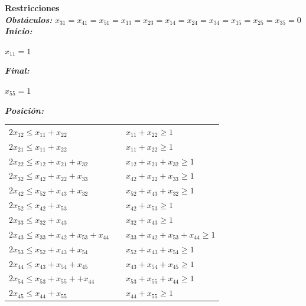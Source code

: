 \documentclass[journal, 10pt]{IEEEtran}
\begin{document}
\textbf{Restricciones}\\

\textbf{\textit{Obstáculos:} }
${x}_{31}={x}_{41}={x}_{51}={x}_{13}={x}_{23}={x}_{14}={x}_{24}={x}_{34}={x}_{15}={x}_{25}= {x}_{35}=0$\\

\textbf{\textit{Inicio: }}
\begin{center}
   ${x}_{11}=1$\\ 
\end{center}

\textbf{\textit{Final: }}
\begin{center}
    ${x}_{55}=1$\\
\end{center}


\textbf{\textit{Posición:} }\\
\begin{table}[H]
\centering
\begin{tabular}{lll}
${2x}_{12}\leq {x}_{11}+{x}_{22}$                   &  & ${x}_{11}+{x}_{22}\geq 1$                   \\
${2x}_{21}\leq {x}_{11}+{x}_{22}$                   &  & ${x}_{11}+{x}_{22}\geq 1$                   \\
${2x}_{22}\leq {x}_{12}+{x}_{21}+{x}_{32}$          &  & ${x}_{12}+{x}_{21}+{x}_{32}\geq 1$          \\
${2x}_{32}\leq {x}_{42}+{x}_{22}+{x}_{33}$          &  & ${x}_{42}+{x}_{22}+{x}_{33}\geq 1$          \\
${2x}_{42}\leq {x}_{52}+{x}_{43}+{x}_{32}$          &  & ${x}_{52}+{x}_{43}+{x}_{32}\geq 1$          \\
${2x}_{52}\leq {x}_{42}+{x}_{53}$                   &  & ${x}_{42}+{x}_{53}\geq 1$                   \\
${2x}_{33}\leq {x}_{32}+{x}_{43}$                   &  & ${x}_{32}+{x}_{43}\geq 1$                   \\
${2x}_{43}\leq {x}_{33}+{x}_{42}+{x}_{53}+{x}_{44}$ &  & ${x}_{33}+{x}_{42}+{x}_{53}+{x}_{44}\geq 1$ \\
${2x}_{53}\leq {x}_{52}+{x}_{43}+{x}_{54}$          &  & ${x}_{52}+{x}_{43}+{x}_{54}\geq 1$          \\
${2x}_{44}\leq {x}_{43}+{x}_{54}+{x}_{45}$          &  & ${x}_{43}+{x}_{54}+{x}_{45}\geq 1$          \\
${2x}_{54}\leq {x}_{53}+{x}_{55}++{x}_{44}$         &  & ${x}_{53}+{x}_{55}+{x}_{44}\geq 1$          \\
${2x}_{45}\leq {x}_{44}+{x}_{55}$                   &  & ${x}_{44}+{x}_{55}\geq 1$                  
\end{tabular}
\end{table}
\end{document}
